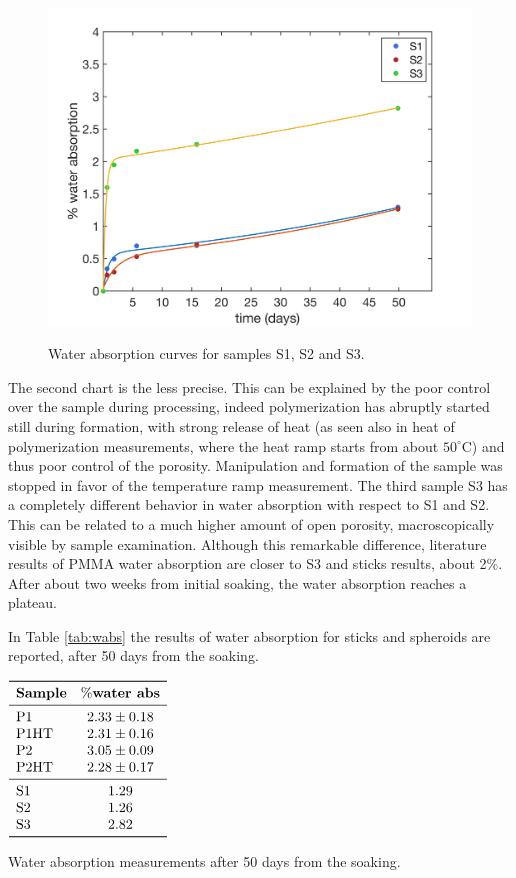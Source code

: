 \documentclass[a4paper, 11pt]{article}
\begin{document}
\begin{figure}[htp]
\centering
{\includegraphics[scale=0.35]{wabs_s}}
\captionsetup{justification=centering}
\caption{Water absorption curves for samples S1, S2 and S3.}
\label{fig:wabs2}
\end{figure}

The second chart is the less precise. This can be explained by the poor control over the sample during processing, indeed polymerization has abruptly started still during formation, with strong release of heat (as seen also in heat of polymerization measurements, where the heat ramp starts from about $50^\circ$C) and thus poor control of the porosity. Manipulation and formation of the sample was stopped in favor of the temperature ramp measurement. The third sample S3 has a completely different behavior in water absorption with respect to S1 and S2. This can be related to a much higher amount of open porosity, macroscopically visible by sample examination. 
\newpage
Although this remarkable difference, literature results of PMMA water absorption are closer to S3 and sticks results, about 2\%. After about two weeks from initial soaking, the water absorption reaches a plateau. 

In Table \ref{tab:wabs} the results of water absorption for sticks and spheroids are reported, after 50 days from the soaking. 
\begin{table}[htp]
\centering
$
\begin{array}{lc}
\toprule
\textbf{Sample} & \textbf{$\%$water abs}  \\
\midrule
\text{P1} & 2.33 \pm0.18 \\
\text{P1HT} & 2.31\pm0.16 \\
\text{P2} & 3.05\pm0.09 \\
\text{P2HT} & 2.28\pm0.17 \\
\midrule
\text{S1} & 1.29 \\
\text{S2} & 1.26 \\
\text{S3} & 2.82 \\
\bottomrule
\end{array}
$
\caption{Water absorption measurements after 50 days from the soaking.}
\label{tab:wabs}
\end{table}\\
\end{document}
